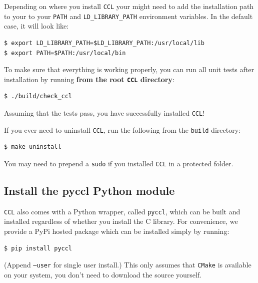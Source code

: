\documentclass[\docopts]{\docclass}
\newcommand{\ccl}{{\tt CCL}\xspace}
\begin{document}
Depending on where you install \ccl your might need to add the installation path
to your to your {\tt PATH} and {\tt LD\_LIBRARY\_PATH} environment variables. In the default
case, it will look like:
\begin{verbatim}
$ export LD_LIBRARY_PATH=$LD_LIBRARY_PATH:/usr/local/lib
$ export PATH=$PATH:/usr/local/bin
\end{verbatim}

To make sure that everything is working properly, you can run all unit tests after installation by running \textbf{from the root \ccl directory}:
\begin{verbatim}
$ ./build/check_ccl
\end{verbatim}
Assuming that the tests pass, you have successfully installed \ccl!

If you ever need to uninstall \ccl, run the following from the {\tt build} directory:
\begin{verbatim}
$ make uninstall
\end{verbatim}
You may need to prepend a {\tt sudo} if you installed \ccl in a protected folder.

\subsection{Install the pyccl Python module}

\ccl also comes with a Python wrapper, called {\tt pyccl}, which can be built and
installed regardless of whether you install the C library. For convenience, we
provide a PyPi hosted package which can be installed simply by running:
\begin{verbatim}
$ pip install pyccl
\end{verbatim}
(Append {\tt --user} for single user install.)
This only assumes that {\tt CMake} is available on your system, you don't need to
download the source yourself.
\end{document}
